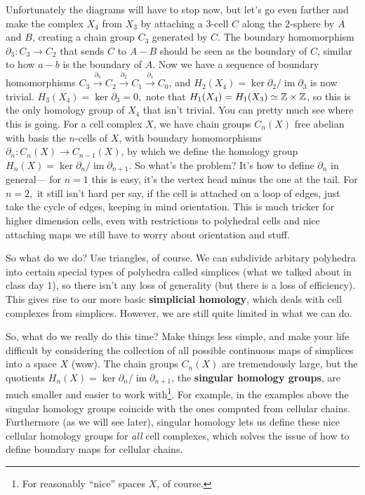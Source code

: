Unfortunately the diagrams will have to stop now, but let's go even farther and make the complex $X_4$ from $X_3$ by attaching a $3$-cell $C$ along the $2$-sphere by $A$ and $B$, creating a chain group $C_3$ generated by $C$. The boundary homomorphism $\partial_3 \colon C_3 \to C_2 $ that sends $C$ to $A-B$ should be seen as the boundary of $C$, similar to how $a-b$ is the boundary of $A$. Now we have a sequence of boundary homomorphisms $C_3 \overset{\partial_3}{\longrightarrow}C_2\overset{\partial_2}{\longrightarrow} C_1 \overset{\partial_1}{\longrightarrow}C_0$, and $H_2(X_4)=\ker \partial_2 /\operatorname{im}\partial_3  $ is now trivial. $H_3(X_4)=\ker \partial_3=0, $ note that $H_1(X_4)=H_1(X_3)\simeq\mathbb{Z}\times \mathbb{Z}$, so this is the only homology group of $X_4$ that isn't trivial.
\orbreak
You can pretty much see where this is going. For a cell complex $X$, we have chain groups $C_n(X)$ free abelian with basis the $n$-cells of $X$, with boundary homomorphisms $\partial_n \colon C_n(X) \to C_{n-1} (X)$, by which we define the homology group $H_n(X) = \ker \partial_n / \operatorname{im}\partial _{n+1} $. So what's the problem? It's how to define $\partial_n $ in general— for $n=1$ this is easy, it's the vertex head minus the one at the tail. For $n=2,$ it still isn't hard per say, if the cell is attached on a loop of edges, just take the cycle of edges, keeping in mind orientation. This is much tricker for higher dimension cells, even with restrictions to polyhedral cells and nice attaching maps we still have to worry about orientation and stuff.

So what do we do? Use triangles, of course. We can subdivide arbitary polyhedra into certain special types of polyhedra called simplices (what we talked about in class day 1), so there isn't any loss of generality (but there is a loss of efficiency). This gives rise to our more basic \textbf{simplicial homology}, which deals with cell complexes from simplices. However, we are still quite limited in what we can do.

So, what do we really do this time? Make things less simple, and make your life difficult by considering the collection of all possible continuous maps of simplices into a space $X$ (wow). The chain groups $C_n(X)$ are tremendously large, but the quotients $H_n(X)=\ker \partial_n / \operatorname{im}\partial _{n+1} $, the \textbf{singular homology groups}, are much smaller and easier to work with\footnote{For reasonably ``nice'' spaces $X$, of course.}. For example, in the examples above the singular homology groups coincide with the ones computed from cellular chains. Furthermore (as we will see later), singular homology lets us define these nice cellular homology groups for \textit{all} cell complexes, which solves the issue of how to define boundary maps for cellular chains.

